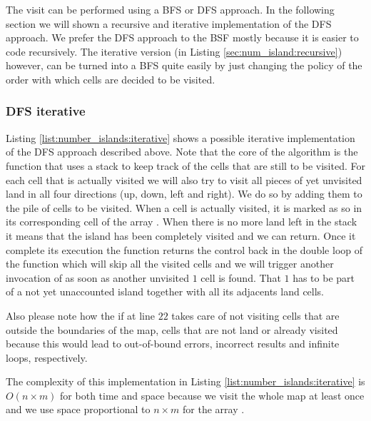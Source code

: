 The visit can be performed using a BFS or DFS approach. In the following section we will shown a
recursive and iterative implementation of the DFS approach. We prefer the DFS approach to the BSF mostly because it is easier to 
code recursively.
The iterative version (in Listing \ref{sec:num_island:recursive}) however, can be turned
into a BFS quite easily by just changing the policy of the order with which cells are decided to be visited.


\subsubsection{DFS iterative}
\label{sec:num_island:iterative}
Listing \ref{list:number_islands:iterative} shows a possible iterative implementation of the DFS
approach described above. Note that the core of the algorithm is the function  that
uses a stack to keep track of the cells that are still to be visited. For each cell that is actually
visited we will also try to visit all pieces of yet unvisited land in all four directions (up, down,
left and right). We do so by adding them to the pile of cells to be visited. When a cell is actually
visited, it is marked as so in its corresponding cell of the array .
When there is no  more land left in the stack it means that the island has been completely visited 
and we can return. Once it complete its execution the function 
returns the control back in the double loop of the function  which will skip all the
visited cells and we will trigger another invocation of  as soon as another unvisited $1$ cell is
found. That $1$ has to be part of a not yet unaccounted island together with all its adjacents land cells.

Also please note how the if at line $22$ takes care of not visiting cells that are outside the
boundaries of the map, cells that are not land or already visited because this would lead to
out-of-bound errors, incorrect results and infinite loops, respectively.

The complexity of this implementation in Listing \ref{list:number_islands:iterative} is 
$O(n\times m)$ for both time and space 
because we visit the whole map at least once and we use space proportional to $n\times m$
for the array .



